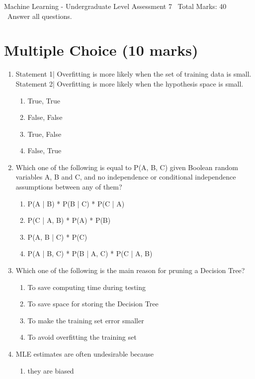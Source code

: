 \documentclass[12pt]{article}
\begin{document}
\begin{center}
Machine Learning - Undergraduate Level Assessment 7 \
Total Marks: 40 \
Answer all questions.
\end{center}

\section*{Multiple Choice (10 marks)}
\begin{enumerate}[label=\arabic*.]
\item Statement 1| Overfitting is more likely when the set of training data is small. Statement 2| Overfitting is more likely when the hypothesis space is small.
\begin{enumerate}[label=(\alph*)]
    \item True, True
    \item False, False
    \item True, False
    \item False, True
\end{enumerate}
\item Which one of the following is equal to P(A, B, C) given Boolean random variables A, B and C, and no independence or conditional independence assumptions between any of them?
\begin{enumerate}[label=(\alph*)]
    \item P(A | B) * P(B | C) * P(C | A)
    \item P(C | A, B) * P(A) * P(B)
    \item P(A, B | C) * P(C)
    \item P(A | B, C) * P(B | A, C) * P(C | A, B)
\end{enumerate}
\item Which one of the following is the main reason for pruning a Decision Tree?
\begin{enumerate}[label=(\alph*)]
    \item To save computing time during testing
    \item To save space for storing the Decision Tree
    \item To make the training set error smaller
    \item To avoid overfitting the training set
\end{enumerate}
\item MLE estimates are often undesirable because
\begin{enumerate}[label=(\alph*)]
    \item they are biased

\end{enumerate}
\end{enumerate}
\end{document}
